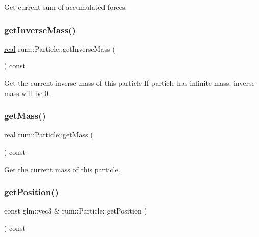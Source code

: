 Get current sum of accumulated forces. \mbox{\label{classrum_1_1_particle_a2a2fa7e2d8c037ac73871f12ea7d6fa3}} 
\subsubsection{\texorpdfstring{get\+Inverse\+Mass()}{getInverseMass()}}
{\footnotesize\ttfamily \mbox{\hyperlink{namespacerum_a7e8cca23573d5eaead0f138cbaa4862c}{real}} rum\+::\+Particle\+::get\+Inverse\+Mass (\begin{DoxyParamCaption}{ }\end{DoxyParamCaption}) const}

Get the current inverse mass of this particle If particle has infinite mass, inverse mass will be 0. \mbox{\label{classrum_1_1_particle_a847e15162df481db80c107cacf3198e1}} 
\subsubsection{\texorpdfstring{get\+Mass()}{getMass()}}
{\footnotesize\ttfamily \mbox{\hyperlink{namespacerum_a7e8cca23573d5eaead0f138cbaa4862c}{real}} rum\+::\+Particle\+::get\+Mass (\begin{DoxyParamCaption}{ }\end{DoxyParamCaption}) const}

Get the current mass of this particle. \mbox{\label{classrum_1_1_particle_a4741a2cda53c710c6243f615285ad083}} 
\subsubsection{\texorpdfstring{get\+Position()}{getPosition()}}
{\footnotesize\ttfamily const glm\+::vec3 \& rum\+::\+Particle\+::get\+Position (\begin{DoxyParamCaption}{ }\end{DoxyParamCaption}) const}

